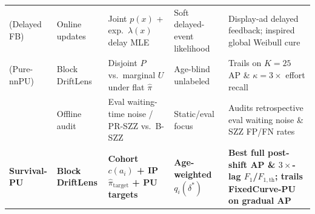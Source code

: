 \documentclass[10pt,a4paper]{article}
\begin{document}
\begin{table}[!htbp]
\begin{tabularx}{\textwidth}{L{3.1cm}L{2.1cm}Y L{2.8cm}L{3.6cm}}
\citet{chapelle2014modeling} (Delayed FB) & Online updates & Joint $p(x)$ + exp.\ $\lambda(x)$ delay MLE & Soft delayed-event likelihood & Display-ad delayed feedback; inspired global Weibull cure \\
\citet{kiryo2017positive} (Pure-nnPU) & Block DriftLens & Disjoint $P$ vs.\ marginal $U$ under flat $\hat{\pi}$ & Age-blind unlabeled & Trails on $K=25$ AP \& $\kappa=3\times$ effort recall \\
\citet{song2023waiting,bludau2026quantifying} & Offline audit & Eval waiting-time noise / PR-SZZ vs.\ B-SZZ & Static/eval focus & Audits retrospective eval waiting noise \& SZZ FP/FN rates \\
\midrule
\textbf{Survival-PU} & \textbf{Block DriftLens} & \textbf{Cohort $c(a_i)$ + IP $\hat{\pi}_{\text{target}}$ + PU targets} & \textbf{Age-weighted $q_i(\delta^*)$} & \textbf{Best full post-shift AP \& $3\times$-lag $F_1$/$F_{1,\text{th}}$; trails FixedCurve-PU on gradual AP} \\
\bottomrule
\end{tabularx}
\end{table}
\end{document}
